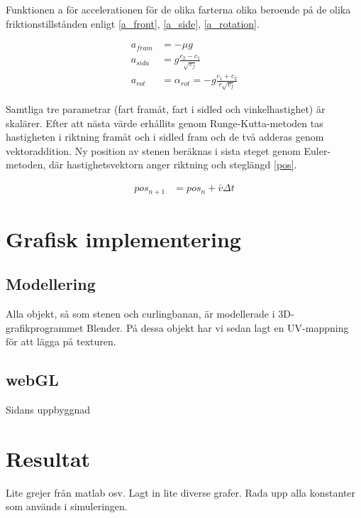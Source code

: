 \documentclass[11pt]{article} %
\begin{document}
Funktionen a för accelerationen för de olika farterna olika beroende på de olika friktionstillstånden enligt \eqref{a_front},  \eqref{a_side}, \eqref{a_rotation}.
 
 \begin{align}\label{a_front}
 a_{fram}& = - \mu g\\\label{a_side}
 a_{sida}& = g \frac{c_2-c_1}{\sqrt{v_f}}\\\label{a_rotation}
 a_{rot}& = \alpha_{rot} = - g\frac{c_1+c_2}{r \sqrt{v_f}}
 \end{align}

Samtliga tre parametrar (fart framåt, fart i sidled och vinkelhastighet) är skalärer. Efter att nästa värde erhållits genom Runge-Kutta-metoden tas hastigheten i riktning framåt och i sidled fram och de två adderas genom vektoraddition. Ny position av stenen beräknas i sista steget genom Euler-metoden, där hastighetsvektorn anger riktning och steglängd \eqref{pos}. 

 \begin{align}\label{pos}
 pos_{n+1}& = pos_{n} + \bar{v} \Delta t
 \end{align}


\section{Grafisk implementering}

\subsection{Modellering}
Alla objekt, så som stenen och curlingbanan, är modellerade i 3D-grafikprogrammet Blender. På dessa objekt har vi sedan lagt en UV-mappning för att lägga på texturen. 

\subsection{webGL}
Sidans uppbyggnad

\pagebreak
\section{Resultat}

Lite grejer från matlab osv. 
Lagt in lite diverse grafer.
Rada upp alla konstanter som används i simuleringen. 
\end{document}
